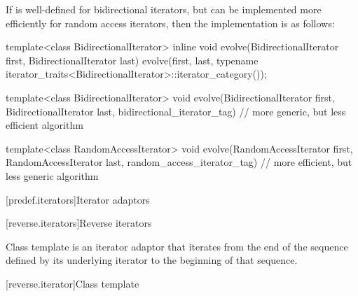 \pnum
\begin{example}
If
is well-defined for bidirectional iterators, but can be implemented more
efficiently for random access iterators, then the implementation is as follows:

\begin{codeblock}
template<class BidirectionalIterator>
inline void
evolve(BidirectionalIterator first, BidirectionalIterator last) {
  evolve(first, last,
    typename iterator_traits<BidirectionalIterator>::iterator_category());
}

template<class BidirectionalIterator>
void evolve(BidirectionalIterator first, BidirectionalIterator last,
  bidirectional_iterator_tag) {
  // more generic, but less efficient algorithm
}

template<class RandomAccessIterator>
void evolve(RandomAccessIterator first, RandomAccessIterator last,
  random_access_iterator_tag) {
  // more efficient, but less generic algorithm
}
\end{codeblock}
\end{example}

[predef.iterators]{Iterator adaptors}

[reverse.iterators]{Reverse iterators}

\pnum
Class template  is an iterator adaptor that iterates
from the end of the sequence defined by its underlying iterator to the beginning
of that sequence. 

[reverse.iterator]{Class template }


